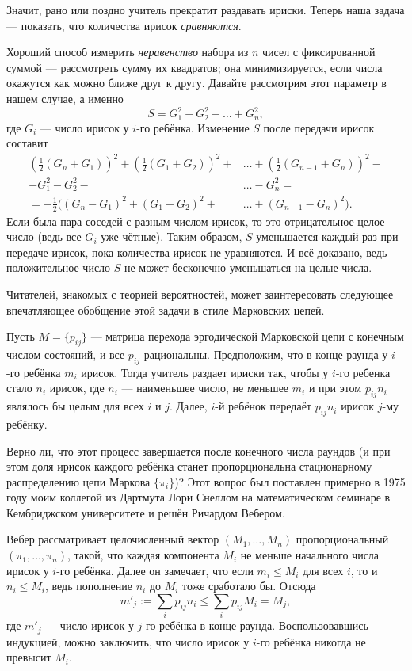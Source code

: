 Значит, рано или поздно учитель прекратит раздавать ириски.
Теперь наша задача --- показать, что количества ирисок \emph{сравняются}.

Хороший способ измерить \emph{неравенство} набора из $n$ чисел с фиксированной суммой --- рассмотреть сумму их квадратов; она минимизируется, если числа окажутся как можно ближе друг к другу.
Давайте рассмотрим этот параметр в нашем случае, а именно 
\[S = G^2_1 + G^2_2 + \dots + G^2_n,\]
где $G_i$ --- число ирисок у $i$-го ребёнка.
Изменение $S$ после передачи ирисок составит
\begin{align*}
\left(\tfrac{1}{2}(G_n+G_1)\right)^2+\left(\tfrac{1}{2}(G_1+G_2)\right)^2+&\dots+\left(\tfrac{1}{2}(G_{n-1}+G_n)\right)^2-
\\
-G_1^2-G_2^2-&\dots-G_n^2=
\\
=-\tfrac12\bigl((G_n-G_1)^2+(G_1-G_2)^2+&\dots+(G_{n-1}-G_n)^2\bigr).
\end{align*}
Если была пара соседей с разным числом ирисок, то это отрицательное целое число (ведь все $G_i$ уже чётные).
Таким образом, $S$ уменьшается каждый раз при передаче ирисок, пока количества ирисок не уравняются.
И всё доказано, ведь положительное число $S$ не может бесконечно уменьшаться на целые числа.

\medskip

Читателей, знакомых с теорией вероятностей, может заинтересовать следующее впечатляющее обобщение этой задачи в стиле Марковских цепей.

Пусть $M=\{p_{ij}\}$ --- матрица перехода эргодической Марковской цепи с конечным числом состояний, и все $p_{ij}$ рациональны.
Предположим, что в конце раунда у $i$-го ребёнка $m_i$ ирисок.
Тогда учитель раздает ириски так, чтобы у $i$-го ребенка стало $n_i$ ирисок, где $n_i$ --- наименьшее число, не меньшее  $m_i$ и при этом $p_{ij}n_i$ являлось бы целым для всех $i$ и $j$.
Далее, $i$-й ребёнок передаёт $p_{ij}n_i$ ирисок $j$-му ребёнку.

Верно ли, что этот процесс завершается после конечного числа раундов
(и при этом доля ирисок каждого ребёнка станет пропорциональна стационарному распределению цепи Маркова $\{\pi_i\}$)?
Этот вопрос был поставлен примерно в 1975 году моим коллегой из Дартмута Лори Снеллом на математическом семинаре в Кембриджском университете и решён Ричардом Вебером.

Вебер рассматривает целочисленный вектор $(M_1, \dots , M_n)$ пропорциональный $(\pi_1, \dots , \pi_n)$, такой, что каждая компонента $M_i$ не меньше начального числа ирисок у $i$-го ребёнка.
Далее он замечает, что если $m_i \leqslant M_i$ для всех $i$, то и $n_i \leqslant M_i$, ведь пополнение $n_i$ до $M_i$ тоже сработало бы.
Отсюда 
\[m'_j
:=
\sum_i p_{ij} n_i
\leqslant
\sum_i p_{ij} M_i
=
M_j,\] где $m'_j$ --- число ирисок у $j$-го ребёнка в конце раунда.
Воспользовавшись индукцией, можно заключить, что число ирисок у $i$-го ребёнка никогда не превысит $M_i$.

